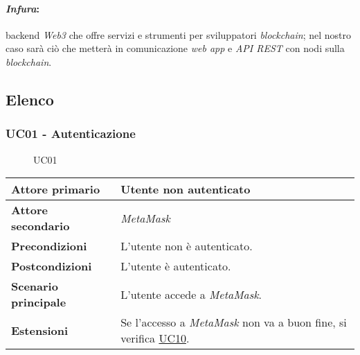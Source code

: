             \paragraph*{\textit{Infura}\glo:} backend \textit{Web3}\glo\: che offre servizi e strumenti per sviluppatori \textit{blockchain}; nel nostro caso sarà ciò che metterà in comunicazione \textit{web app} e \textit{API REST} con nodi\glo\: sulla \textit{blockchain}.

    \subsection{Elenco}

        \subsubsection{UC01 - Autenticazione}
        \label{UC01}

            \begin{figure}[H]
                \centering
                
                \caption{UC01}
            \end{figure}

            \begin{center}
                \renewcommand{\arraystretch}{1.5}
                \begin{tabular}{m{10em} m{20em}}
                    \hline
                    \textbf{Attore primario} & Utente non autenticato \\
                    \hline
                    \textbf{Attore secondario} & \textit{MetaMask} \\
                    \hline
                    \textbf{Precondizioni} & L'utente non è autenticato. \\
                    \hline
                    \textbf{Postcondizioni} & L'utente è autenticato. \\
                    \hline
                    \textbf{Scenario principale} & L'utente accede a \textit{MetaMask}. \\
                    \hline
                    \textbf{Estensioni} & Se l'accesso a \textit{MetaMask} non va a buon fine, si verifica \hyperref[UC10]{UC10}. \\
                    \hline
                \end{tabular}
            \end{center}

